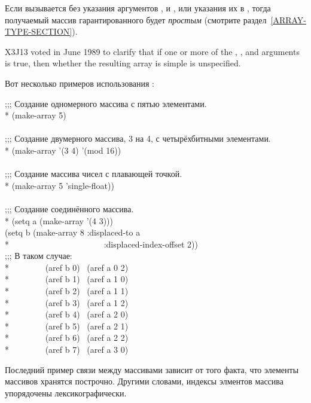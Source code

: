 \begin{defun}[Функция]
Если  вызывается без указания аргументов ,
 и , или указания их в {\nil}, тогда
получаемый массив гарантированного будет \emph{простым} (смотрите
раздел~\ref{ARRAY-TYPE-SECTION}). 

\begin{newer}
X3J13 voted in June 1989
to clarify that if one or more of the , ,
and  arguments is true, then whether the resulting
array is simple is unspecified.
\end{newer}

Вот несколько примеров использования :
\begin{lisp}
;;; Создание одномерного массива с пятью элементами. \\*
(make-array 5) \\
 \\
;;; Создание двумерного массива, 3 на 4, с четырёхбитными элементами. \\*
(make-array '(3 4)  '(mod 16)) \\
 \\
;;; Создание массива чисел с плавающей точкой.\\*
(make-array 5  'single-float)) \\
\\
;;; Создание соединённого массива. \\*
(setq a (make-array '(4 3))) \\
(setq b (make-array 8 :displaced-to a \\*
~~~~~~~~~~~~~~~~~~~~~~:displaced-index-offset 2)) \\
;;; В таком случае: \\*
~~~~~~~~(aref b 0) \EQ\ (aref a 0 2) \\*
~~~~~~~~(aref b 1) \EQ\ (aref a 1 0) \\*
~~~~~~~~(aref b 2) \EQ\ (aref a 1 1) \\*
~~~~~~~~(aref b 3) \EQ\ (aref a 1 2) \\*
~~~~~~~~(aref b 4) \EQ\ (aref a 2 0) \\*
~~~~~~~~(aref b 5) \EQ\ (aref a 2 1) \\*
~~~~~~~~(aref b 6) \EQ\ (aref a 2 2) \\*
~~~~~~~~(aref b 7) \EQ\ (aref a 3 0)
\end{lisp}
Последний пример связи между массивами зависит от того факта, что элементы
массивов хранятся построчно. Другими словами, индексы элментов массива
упорядочены лексикографически.
\end{defun}

